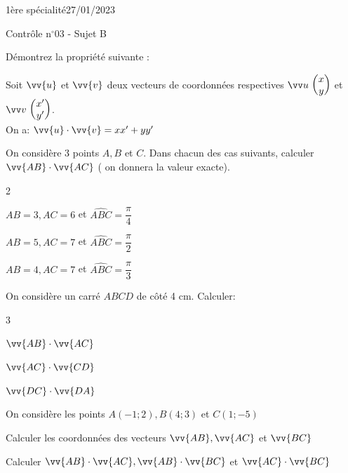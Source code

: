\documentclass[a4paper,12pt]{article}        %
\begin{document}
\graphicspath{{../images/}}
\pagestyle{empty}
\vspace*{-1.5cm}
1ère spécialité\phantom{xxxxxxxxxxxxxxxxxxxxxxxxxxxxxxxxxxxxxxxxxxxxxxxxxxxxxxxxxxxxxxx}27/01/2023
{\begin{center}\Huge{Contrôle n$^{\circ}$03 - Sujet B}\end{center}}


Démontrez la propriété suivante :
\begin{propriete}
	Soit $\vv{u}$ et $\vv{v}$ deux vecteurs de coordonnées respectives $\Coord{u}{x}{y}$ et $\Coord{v}{x'}{y'}$.\\
	On a: $\vv{u} \cdot \vv{v}=x x^{\prime}+y y^{\prime}$
\end{propriete}


On considère 3 points $A, B$ et $C$. Dans chacun des cas suivants, calculer $\vv{A B} \cdot \vv{A C}$ ( on donnera la valeur exacte).
\begin{multicols}{2}
	\begin{enumMet}
		\item $A B=3, A C=6$ et $\widehat{A B C}=\dfrac{\pi}{4}$
		\item $A B=5, A C=7$ et $\widehat{A B C}=\dfrac{\pi}{2}$
		\item $A B=4, A C=7$ et $\widehat{A B C}=\dfrac{\pi}{3}$
	\end{enumMet}
\end{multicols}

\vspace{-0.3cm}
On considère un carré $A B C D$ de côté 4 cm. Calculer:
\begin{multicols}{3}
	\begin{enumMet}
		\item $\vv{A B} \cdot \vv{A C}$
		\item $\vv{AC} \cdot \vv{C D}$
		\item $\vv{D C} \cdot \vv{D A}$
	\end{enumMet}
\end{multicols}

\vspace{-0.3cm}
On considère les points $A(-1 ; 2), B(4 ; 3)$ et $C(1 ;-5)$
\begin{enumMet}
	\item Calculer les coordonnées des vecteurs $\vv{A B}, \vv{A C}$ et $\vv{B C}$
	\item Calculer $\vv{A B} \cdot \vv{A C}, \vv{A B} \cdot \vv{B C}$ et $\vv{A C} \cdot \vv{B C}$
\end{enumMet}
\end{document}
